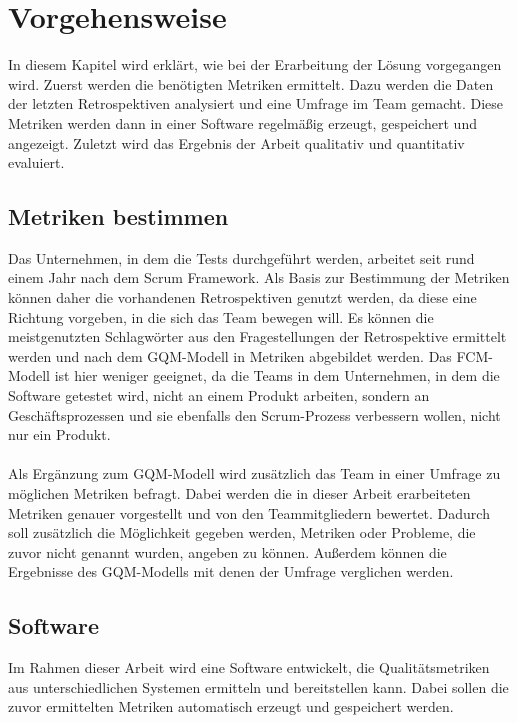 \chapter{Vorgehensweise}

In diesem Kapitel wird erklärt, wie bei der Erarbeitung der Lösung vorgegangen wird.
Zuerst werden die benötigten Metriken ermittelt.
Dazu werden die Daten der letzten Retrospektiven analysiert und eine Umfrage im Team gemacht.
Diese Metriken werden dann in einer Software regelmäßig erzeugt, gespeichert und angezeigt.
Zuletzt wird das Ergebnis der Arbeit qualitativ und quantitativ evaluiert.

\section{Metriken bestimmen}

Das Unternehmen, in dem die Tests durchgeführt werden, arbeitet seit rund einem Jahr nach dem Scrum Framework.
Als Basis zur Bestimmung der Metriken können daher die vorhandenen Retrospektiven genutzt werden, da diese eine Richtung vorgeben, in die sich das Team bewegen will.
Es können die meistgenutzten Schlagwörter aus den Fragestellungen der Retrospektive ermittelt werden und nach dem \ac{GQM}-Modell in Metriken abgebildet werden.
Das \ac{FCM}-Modell ist hier weniger geeignet, da die Teams in dem Unternehmen, in dem die Software getestet wird, nicht an einem Produkt arbeiten, sondern an Geschäftsprozessen und sie ebenfalls den Scrum-Prozess verbessern wollen, nicht nur ein Produkt.
\\
\\
Als Ergänzung zum \ac{GQM}-Modell wird zusätzlich das Team in einer Umfrage zu möglichen Metriken befragt.
Dabei werden die in dieser Arbeit erarbeiteten Metriken genauer vorgestellt und von den Teammitgliedern bewertet.
Dadurch soll zusätzlich die Möglichkeit gegeben werden, Metriken oder Probleme, die zuvor nicht genannt wurden, angeben zu können.
Außerdem können die Ergebnisse des \ac{GQM}-Modells mit denen der Umfrage verglichen werden.

\clearpage
\section{Software}

Im Rahmen dieser Arbeit wird eine Software entwickelt, die Qualitätsmetriken aus unterschiedlichen Systemen ermitteln und bereitstellen kann.
Dabei sollen die zuvor ermittelten Metriken automatisch erzeugt und gespeichert werden.

